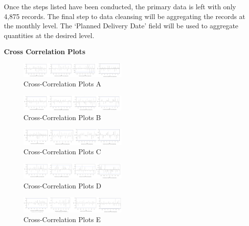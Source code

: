 \documentclass[12pt,oneside]{chicagocapstone}
\begin{document}
Once the steps listed have been conducted, the primary data is left with only 4,875 records. The final step to data cleansing will be aggregating the records at the monthly level. The `Planned Delivery Date' field will be used to aggregate quantities at the desired level.

\textbf{Cross Correlation Plots}
\begin{figure}

{\centering \includegraphics[width=200px,angle = 0, scale=2.5]{figure/ccf1} 

}

\caption{Cross-Correlation Plots A}\label{fig:ccf1}
\end{figure}
\begin{figure}

{\centering \includegraphics[width=200px,angle = 0, scale=2.5]{figure/ccf2} 

}

\caption{Cross-Correlation Plots B}\label{fig:ccf2}
\end{figure}
\begin{figure}

{\centering \includegraphics[width=200px,angle = 0, scale=2.5]{figure/ccf3} 

}

\caption{Cross-Correlation Plots C}\label{fig:ccf3}
\end{figure}
\begin{figure}

{\centering \includegraphics[width=200px,angle = 0, scale=2.5]{figure/ccf4} 

}

\caption{Cross-Correlation Plots D}\label{fig:ccf4}
\end{figure}
\begin{figure}

{\centering \includegraphics[width=200px,angle = 0, scale=2.5]{figure/ccf5} 

}

\caption{Cross-Correlation Plots E}\label{fig:ccf5}
\end{figure}
\end{document}
